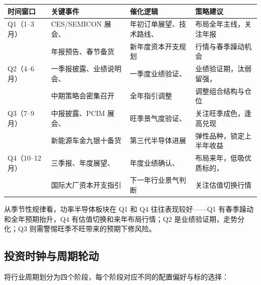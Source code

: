 \begin{exhibitbox}[表 10-7：年度催化日历与策略建议]
\centering
\small
\begin{tabularx}{\textwidth}{L{1.5cm} L{3.0cm} L{4.5cm} L{4.0cm}}
\toprule
\textbf{时间窗口} & \textbf{关键事件} & \textbf{催化逻辑} & \textbf{策略建议} \\
\midrule
{}
Q1（1–3月） & CES/SEMICON 展会、 & 年初订单展望、技术路线、 & 布局全年主线，关注年报 & \\
& 年报预告、春节备货 & 新年度资本开支规划 & 行情与春季躁动机会 \\
\midrule
{}
Q2（4–6月） & 一季报披露、业绩说明会、 & 一季度业绩验证、 & 业绩验证期，汰弱留强， \\
& 中期策略会密集召开 & 全年指引调整 & 调整组合结构与仓位 \\
\midrule
{}
Q3（7–9月） & 中报披露、PCIM 展会、 & 旺季景气度验证、 & 关注旺季成色，逢高兑现 & \\
& 新能源车金九银十备货 & 第三代半导体进展 & 弹性品种，锁定上半年收益 \\
\midrule
{}
Q4（10–12月） & 三季报、年度展望、 & 年度业绩确认、 & 布局来年，低吸优质标的， & \\
& 国际大厂资本开支指引 & 下一年行业景气判断 & 关注估值切换行情 \\
\bottomrule
\end{tabularx}
\end{exhibitbox}

从季节性规律看，功率半导体板块在 Q1 和 Q4 往往表现较好——Q1 有春季躁动和全年预期抬升，Q4 有估值切换和来年布局行情；Q2 是业绩验证期，走势分化；Q3 则需警惕旺季不旺带来的预期下修风险。

\subsection{投资时钟与周期轮动}

将行业周期划分为四个阶段，每个阶段对应不同的配置偏好与标的选择：


